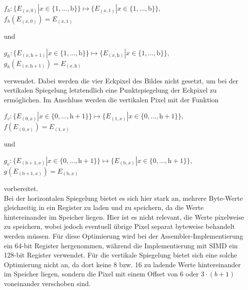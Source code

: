 \documentclass[course=asp]{aspdoc}
\begin{document}
\begin{center}
$f_h:\{E_{(x,0)}|x \in \{1, ..., \text{b}\}\} \mapsto \{E_{(x,1)}|x \in \{1, ..., \text{b}\}\},$\\$f_h(E_{(x, 0)}) = E_{(x,1)}$
\end{center}
und 
\begin{center}
$g_h:\{E_{(x,\text{h}+1)}|x \in \{1, ..., \text{b}\}\} \mapsto \{E_{(x,\text{h})}|x \in \{1, ..., \text{b}\}\},$\\$g_h(E_{(x, \text{h}+1)}) = E_{(x,\text{h})}$
\end{center}
verwendet.
Dabei werden die vier Eckpixel des Bildes nicht gesetzt, um bei der vertikalen Spiegelung letztendlich eine Punktspiegelung der Eckpixel zu ermöglichen. Im Anschluss werden die vertikalen Pixel mit der Funktion 
\begin{center}
$f_v:\{E_{(0,x)}|x \in \{0, ..., \text{h}+1\}\} \mapsto \{E_{(1,x)}|x \in \{0, ..., \text{h}+1\}\},$\\$f(E_{(0,x)}) = E_{(1,x)}$
\end{center}
und 
\begin{center}
$g_v:\{E_{(\text{b}+1,x)}|x \in \{0, ..., \text{h}+1\}\} \mapsto \{E_{(\text{b},x)}|x \in \{0, ..., \text{h}+1\}\},$\\$g(E_{( \text{b}+1,x)}) = E_{(\text{b},x)}$
\end{center}
vorbereitet.\\
Bei der horizontalen Spiegelung bietet es sich hier stark an, mehrere Byte-Werte gleichzeitig in ein Register zu laden und zu speichern, da die Werte hintereinander im Speicher liegen. Hier ist es nicht relevant, die Werte pixelweise zu speichern, wobei jedoch eventuell übrige Pixel separat byteweise behandelt werden müssen. Für diese Optimierung wird bei der Assembler-Implementierung ein 64-bit Register hergenommen, während die Implementierung mit SIMD ein 128-bit Register verwendet. Für die vertikale Spiegelung bietet sich eine solche Optimierung nicht an, da dort keine 8 bzw. 16 zu ladende Werte hintereinander im Speicher liegen, sondern die Pixel mit einem Offset von 6 oder $3 \cdot (b + 1)$ voneinander verschoben sind.

\end{document}
